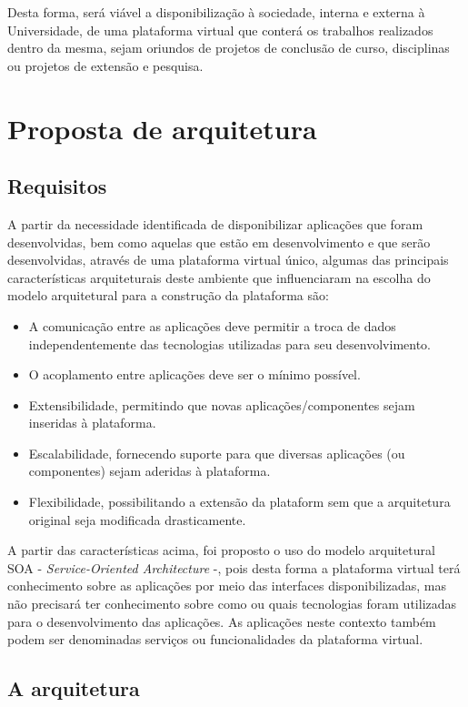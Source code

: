 Desta forma, será viável a disponibilização à sociedade, interna e externa à Universidade, de uma plataforma virtual que conterá os trabalhos realizados dentro da mesma, sejam oriundos de projetos de conclusão de curso, disciplinas ou projetos de extensão e pesquisa.

\section{Proposta de arquitetura}

\subsection{Requisitos}
A partir da necessidade identificada de disponibilizar aplicações que foram desenvolvidas, bem como aquelas que estão em desenvolvimento e que serão desenvolvidas, através de uma plataforma virtual único, algumas das principais características arquiteturais deste ambiente que influenciaram na escolha do modelo arquitetural para a construção da plataforma são:

\begin{itemize}
\item A comunicação entre as aplicações deve permitir a troca de dados independentemente das tecnologias utilizadas para seu desenvolvimento.
\item O acoplamento entre aplicações deve ser o mínimo possível.
\item Extensibilidade, permitindo que novas aplicações/componentes sejam inseridas à plataforma.
\item Escalabilidade, fornecendo suporte para que diversas aplicações (ou componentes) sejam aderidas à plataforma.
\item Flexibilidade,  possibilitando a extensão da plataform sem que a arquitetura original seja modificada drasticamente.
\end{itemize}

A partir das características acima, foi proposto o uso do modelo arquitetural SOA - \textit{Service-Oriented Architecture} -, pois desta forma a plataforma virtual terá conhecimento sobre as aplicações por meio das interfaces disponibilizadas, mas não precisará ter conhecimento sobre como ou quais tecnologias foram utilizadas para o desenvolvimento das aplicações. As aplicações neste contexto também podem ser denominadas serviços ou funcionalidades da plataforma virtual.

\subsection{A arquitetura}

